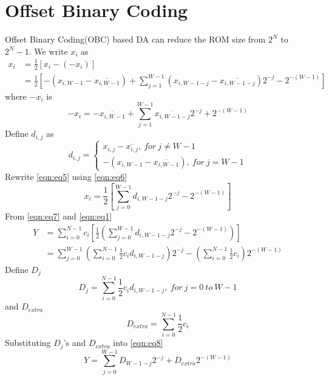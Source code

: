 \section{Offset Binary Coding}
Offset Binary Coding(OBC) based DA can reduce the ROM size from $2^N$ to $2^N-1$.
We write $x_i$ as
\begin{equation}\label{eqn:eq5}
\begin{split}
x_i &= \frac{1}{2}[x_i-(-x_i)]\\
    &= \frac{1}{2}[ -(x_{i, W-1}-\overline{x_{i, W-1}}) + \sum_{j=1}^{W-1}(x_{i, W-1-j} -\overline{x_{i, W-1-j}})2^{-j} - 2^{-(W-1)}]
\end{split}
\end{equation}
where $-x_i$ is
\begin{equation}
-x_i = -\overline{x_{i, W-1}} + \sum_{j=1}^{W-1}\overline{x_{i, W-1-j}}2^{-j} + 2^{-(W-1)}
\end{equation}
Define $d_{i,j}$ as
\begin{equation}\label{eqn:eq6}
d_{i,j} =
\begin{cases}
x_{i,j} - \overline{x_{i,j}},\ for \  j\neq W-1\\
-(x_{i, W-1} - \overline{x_{i, W-1}}),\ for\ j=W-1
\end{cases}
\end{equation}
Rewrite \eqref{eqn:eq5} using \eqref{eqn:eq6}
\begin{equation}\label{eqn:eq7}
x_i = \frac{1}{2}[\sum_{j=0}^{W-1}d_{i, W-1-j}2^{-j} - 2^{-(W-1)}]
\end{equation}
From \eqref{eqn:eq7} and \eqref{eqn:eq1}
\begin{equation}\label{eqn:eq8}
\begin{split}
Y &= \sum_{i=0}^{N-1}c_i[\frac{1}{2}(\sum_{j=0}^{W-1}d_{i, W-1-j}2^{-j} - 2^{-(W-1)})]\\
  &= \sum_{j=0}^{W-1}(\sum_{i=0}^{N-1}\frac{1}{2}c_id_{i,W-1-j})2^{-j} - (\sum_{i=0}^{N-1}\frac{1}{2}c_i)2^{-(W-1)}
\end{split}
\end{equation}
Define $D_j$
\begin{equation}
D_j = \sum_{i=0}^{N-1}\frac{1}{2}c_id_{i,W-1-j},\ for\ j=0\ to\ W-1
\end{equation}
and $D_{extra}$
\begin{equation}
D_{extra} = \sum_{i=0}^{N-1}\frac{1}{2}c_i
\end{equation}
Substituting $D_j$'s and $D_{extra}$ into \eqref{eqn:eq8}
\begin{equation}
Y = \sum_{j=0}^{W-1}D_{W-1-j}2^{-j} + D_{extra}2^{-(W-1)}
\end{equation}

